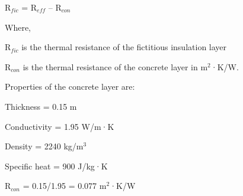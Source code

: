 R\(_{fic}\) = R\(_{eff}\) -- R\(_{con}\)

Where,

R\(_{fic}\) is the thermal resistance of the fictitious insulation layer

R\(_{con}\) is the thermal resistance of the concrete layer in m\(^{2}\)·K/W.

Properties of the concrete layer are:

Thickness = 0.15 m

Conductivity = 1.95 W/m·K

Density = 2240 kg/m\(^{3}\)

Specific heat = 900 J/kg·K

R\(_{con}\) = 0.15/1.95 = 0.077 m\(^{2}\)·K/W
